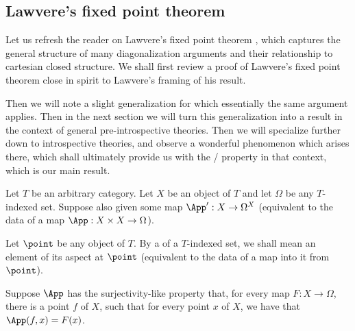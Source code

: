 
\subsection{Lawvere's fixed point theorem}
Let us refresh the reader on Lawvere's fixed point theorem \autocite{lawvere1969diagonal}, which captures the general structure of many diagonalization arguments and their relationship to cartesian closed structure. We shall first review a proof of Lawvere's fixed point theorem close in spirit to Lawvere's framing of his result.

Then we will note a slight generalization for which essentially the same argument applies. Then in the next section we will turn this generalization into a result in the context of general pre-introspective theories. Then we will specialize further down to introspective theories, and observe a wonderful  phenomenon which arises there, which shall ultimately provide us with the \Loeb/ property in that context, which is our main result.

\label{LawveresFixedPointTheorem}
Let $T$ be an arbitrary category. Let $X$ be an object of $T$ and let $\Omega$ be any $T$-indexed set. Suppose also given some map $\App' : X \to \Omega^X$ (equivalent to the data of a map $\App : X \times X \to \Omega$).

Let $\point$ be any object of $T$. By a  of a $T$-indexed set, we shall mean an element of its aspect at $\point$ (equivalent to the data of a map into it from $\point$).

Suppose $\App$ has the surjectivity-like property that, for every map $F : X \to \Omega$, there is a point $f$ of $X$, such that for every point $x$ of $X$, we have that $\App(f, x) = F(x)$.

